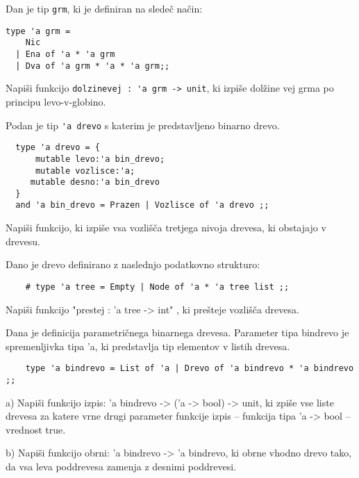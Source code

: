 \begin{ex}
  Dan je tip \lstinline{grm}, ki je definiran na slede\v c na\v cin:

\begin{lstlisting}
type 'a grm = 
    Nic 
  | Ena of 'a * 'a grm 
  | Dva of 'a grm * 'a * 'a grm;;
\end{lstlisting}

  Napi\v si funkcijo \lstinline{dolzinevej : 'a grm -> unit}, ki izpi\v
  se dol\v zine vej grma po principu levo-v-globino.


\end{ex} 
\begin{ex} 
  Podan je tip \lstinline{'a drevo} s katerim je predstavljeno binarno
  drevo.

  \begin{lstlisting}
  type 'a drevo = { 
      mutable levo:'a bin_drevo; 
      mutable vozlisce:'a; 
     mutable desno:'a bin_drevo 
  } 
  and 'a bin_drevo = Prazen | Vozlisce of 'a drevo ;;
  \end{lstlisting}

  Napi\v si funkcijo, ki izpi\v se vsa vozli\v s\v ca tretjega nivoja
  drevesa, ki obstajajo v drevesu.


\end{ex} 
\begin{ex}
Dano je drevo definirano z naslednjo podatkovno strukturo:

\begin{lstlisting}
	# type 'a tree = Empty | Node of 'a * 'a tree list ;;
\end{lstlisting}
Napi\v si funkcijo "prestej : 'a tree -> int" , ki pre\v steje vozli\v s\v ca drevesa.



\end{ex}
\begin{ex}
Dana je definicija parametri\v cnega binarnega drevesa. Parameter tipa bindrevo je spremenljivka tipa 'a, ki predstavlja tip elementov v listih drevesa.

\begin{lstlisting}
	type 'a bindrevo = List of 'a | Drevo of 'a bindrevo * 'a bindrevo ;;
\end{lstlisting}

a) Napi\v si funkcijo izpis: 'a bindrevo -> ('a -> bool) -> unit, ki zpi\v se vse liste drevesa za katere vrne drugi parameter funkcije izpis -- funkcija tipa 'a -> bool -- vrednost true. 

b) Napi\v si funkcijo obrni: 'a bindrevo -> 'a bindrevo, ki obrne vhodno drevo tako, da vsa leva poddrevesa zamenja z desnimi poddrevesi. 

\end{ex}
